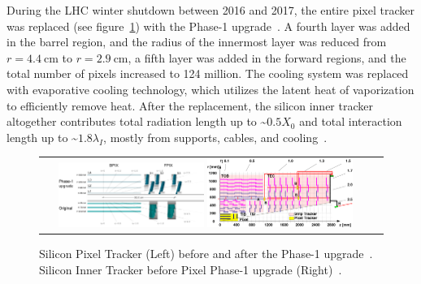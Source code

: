 During the LHC winter shutdown between 2016 and 2017, the entire pixel tracker was replaced (see figure~\ref{Inner_Tracker}) with the Phase-1 upgrade~\cite{Lipinski_2017}.
A fourth layer was added in the barrel region, and the radius of the innermost layer was reduced from $r = \SI{4.4}{\cm}$ to $r = \SI{2.9}{\cm}$, a fifth layer was added in the forward regions, and the total number of pixels increased to 124 million.
The cooling system was replaced with evaporative  cooling technology, which utilizes the latent heat of vaporization to efficiently remove heat.
After the replacement, the silicon inner tracker altogether contributes total radiation length up to \sim$0.5 X_0$ and total interaction length up to \sim$1.8 \lambda_I$, mostly from supports, cables, and cooling~\cite{Sirunyan:2270046}.
\begin{figure}[htb]
  \begin{center}
    \begin{tabular}{cc}
        \includegraphics[width=0.45\textwidth]{fig_LHC_CMS/Pixel_Upgrade.png}
        \includegraphics[width=0.45\textwidth]{fig_LHC_CMS/Inner_Tracker.png}
    \end{tabular}
    \caption{Silicon Pixel Tracker (Left) before and after the Phase-1 upgrade~\cite{Adam_2021}.
             Silicon Inner Tracker before Pixel Phase-1 upgrade (Right)~\cite{Chatrchyan:1211825}.
            }
    \label{Inner_Tracker}
  \end{center}
\end{figure}

